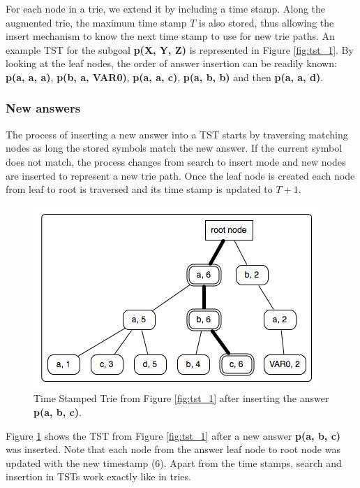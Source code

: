   For each node in a trie, we extend it by including a time stamp. Along the augmented trie, the maximum time stamp
  $T$ is also stored, thus allowing the insert mechanism to know the next time stamp to use for new trie paths.
  An example TST for the subgoal \textbf{p(X, Y, Z)} is represented in Figure \ref{fig:tst_1}.
  By looking at the leaf nodes, the order of answer insertion
  can be readily known: \textbf{p(a, a, a)}, \textbf{p(b, a, VAR0)}, \textbf{p(a, a, c)}, \textbf{p(a, b, b)} and then
  \textbf{p(a, a, d)}.
  
  \subsubsection{New answers}
  
  The process of inserting a new answer into a TST starts by traversing matching nodes as long the stored symbols
  match the new answer. If the current symbol does not match, the process changes from search to insert mode and
  new nodes are inserted to represent a new trie path. Once the leaf node is created each node from leaf to root
  is traversed and its time stamp is updated to $T + 1$.
  
  \begin{figure}[ht]
    \centering
      \includegraphics[scale=0.6]{tst_2.png}
    \caption{Time Stamped Trie from Figure \ref{fig:tst_1} after inserting the answer \textbf{p(a, b, c)}.}
    \label{fig:tst_2}
  \end{figure}
  
  Figure \ref{fig:tst_2} shows the TST from Figure \ref{fig:tst_1} after a new answer \textbf{p(a, b, c)} was inserted.
  Note that each node from the answer leaf node to root node was updated with the new timestamp (6). Apart from
  the time stamps, search and insertion in TSTs work exactly like in tries.
  
